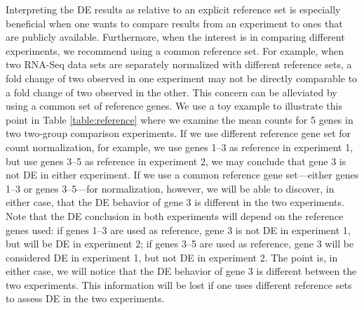 				Interpreting the DE results as relative to an explicit reference set is
				especially beneficial when one wants to compare results from an experiment to ones that are publicly available. 
				Furthermore, when the interest is in comparing different experiments, we recommend using a common reference set. 
				For example, when two RNA-Seq data sets are separately
				normalized with different reference sets, a fold change of two observed in one
				experiment may not be directly comparable to a fold change of two observed in
				the other.  This concern can be alleviated by using a common set of reference
				genes.  We use a toy example to illustrate this point in Table
				\ref{table:reference} where we examine the mean counts for 5 genes in two
				two-group comparison experiments. If we use different reference gene set for
				count normalization, for example, we use genes 1--3 as reference in experiment
				1, but use genes 3--5 as reference in experiment 2, we may conclude that gene
				3 is not DE in either experiment. If we use a common reference gene
				set---either genes 1--3 or genes 3--5---for normalization, however, we will be
				able to discover, in either case, that the DE behavior of gene 3 is different
				in the two experiments. Note that the DE conclusion in both experiments will
				depend on the reference genes used: if genes 1--3 are used as reference, gene
				3 is not DE in experiment 1, but will be DE in experiment 2; if genes 3--5 are
				used as reference, gene 3 will be considered DE in experiment 1, but not DE in
				experiment 2. The point is, in either case, we will notice that the DE
				behavior of gene 3 is different between the two experiments. This information
				will be lost if one uses different reference sets to assess DE in the two
				experiments.
				
				
				
